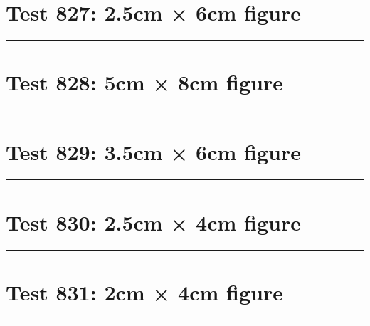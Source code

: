 \documentclass[a4paper,11pt]{article}
\begin{document}
\section*{Test 827: 2.5cm × 6cm figure}
\begin{swarmwrap}%
  \begin{minipage}[t]{2cm}
    \centering
    \rule{\linewidth}{6cm}
  \end{minipage}%
\end{swarmwrap}%
\swarmwrapnext
\lipsum[82]
\lipsum[83]
\lipsum[84]
\lipsum[85]
\lipsum[86]
\section*{Test 828: 5cm × 8cm figure}
\begin{swarmwrap}%
  \begin{minipage}[t]{5cm}
    \centering
    \rule{\linewidth}{8cm}
  \end{minipage}%
\end{swarmwrap}%
\swarmwrapnext
\lipsum[83]
\lipsum[84]
\lipsum[85]
\lipsum[86]
\lipsum[87]
\section*{Test 829: 3.5cm × 6cm figure}
\begin{swarmwrap}%
  \begin{minipage}[t]{3cm}
    \centering
    \rule{\linewidth}{6cm}
  \end{minipage}%
\end{swarmwrap}%
\swarmwrapnext
\lipsum[21]
\lipsum[22]
\lipsum[23]
\lipsum[24]
\section*{Test 830: 2.5cm × 4cm figure}
\begin{swarmwrap}%
  \begin{minipage}[t]{2cm}
    \centering
    \rule{\linewidth}{4cm}
  \end{minipage}%
\end{swarmwrap}%
\swarmwrapnext
\lipsum[41]
\lipsum[42]
\lipsum[43]
\section*{Test 831: 2cm × 4cm figure}
\begin{swarmwrap}%
  \begin{minipage}[t]{2cm}
    \centering
    \rule{\linewidth}{4cm}
  \end{minipage}%
\end{swarmwrap}%
\swarmwrapnext
\lipsum[121]
\lipsum[122]
\lipsum[123]
\lipsum[124]
\lipsum[125]
\lipsum[126]
\end{document}
